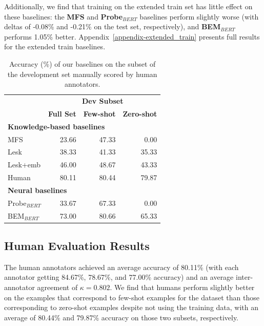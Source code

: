 \documentclass[11pt,a4paper]{article}
\begin{document}
Additionally, we find that training on the extended train set has little effect on these baselines: the \textbf{MFS} and \textbf{Probe$_{BERT}$} baselines perform slightly worse (with deltas of \mbox{-0.08\%} and -0.21\% on the test set, respectively), and \textbf{BEM$_{BERT}$} performs 1.05\% better. Appendix~\ref{appendix-extended_train} presents full results for the extended train baselines.

\begin{table}[t]
    \centering
    \begin{tabular}{l | r r r } 
    \toprule
     & \multicolumn{3}{c}{\textbf{Dev Subset}} \\
     & \textbf{Full Set}& \textbf{Few-shot} & \textbf{Zero-shot} \\
    \hline
    \hline
    \multicolumn{4}{l}{\textbf{Knowledge-based baselines}} \\
    \hline
    MFS & 23.66 & 47.33 & 0.00\\
    Lesk & 38.33 & 41.33 & 35.33 \\
    Lesk+emb & 46.00 & 48.67 & 43.33 \\
    \hline
    Human & 80.11 & 80.44 & 79.87 \\
    \hline
    \hline
    \multicolumn{4}{l}{\textbf{Neural baselines}} \\ 
    \hline
    Probe$_{BERT}$ & 33.67 & 67.33 & 0.00 \\
    BEM$_{BERT}$ & 73.00 & 80.66 &65.33 \\
    \toprule
    \end{tabular}
    \caption{Accuracy (\%) of our baselines on the subset of the development set manually scored by human annotators.}
    \label{human-subset-baselines}
\end{table}

\subsection{Human Evaluation Results}
\label{human-eval-sec}
The human annotators achieved an average accuracy of 80.11\% (with each annotator getting 84.67\%, 78.67\%, and 77.00\% accuracy) and an average inter-annotator agreement of $\kappa = 0.802$. We find that humans perform slightly better on the examples that correspond to few-shot examples for the dataset than those corresponding to zero-shot examples despite not using the training data, with an average of 80.44\% and 79.87\% accuracy on those two subsets, respectively.
\end{document}

